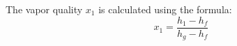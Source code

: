 The vapor quality \( x_1 \) is calculated using the formula:  
\[
x_1 = \frac{h_1 - h_f}{h_g - h_f}
\]